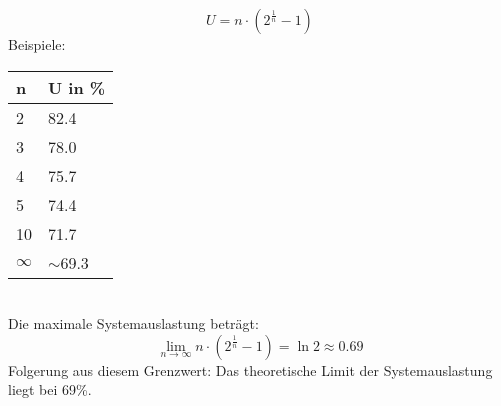 \begin{equation}
U = n\cdot(2^\frac{1}{n}-1)
\end{equation}
Beispiele:\\
\begin{tabular}{l | l}
\hline
n & U in \%\\
\hline
2 & 82.4\\
\hline
3 & 78.0\\
\hline
4 & 75.7\\
\hline
5 & 74.4\\
\hline
10 & 71.7\\
\hline
$\infty$ & $\sim$69.3
\end{tabular}\\
Die maximale Systemauslastung beträgt: 
\begin{equation}
\lim_{n \to \infty}n\cdot(2^\frac{1}{n}-1) = \ln 2 \approx 0.69
\end{equation}
Folgerung aus diesem Grenzwert: Das theoretische Limit der Systemauslastung
liegt bei 69\%. 

